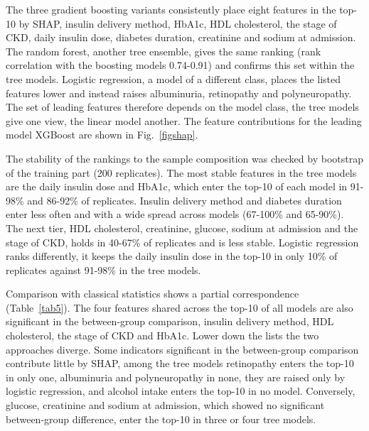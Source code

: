\documentclass[pdflatex,sn-basic,Numbered]{sn-jnl}
\begin{document}
The three gradient boosting variants consistently place eight features in the top-10 by SHAP, insulin delivery method, HbA1c, HDL cholesterol, the stage of CKD, daily insulin dose, diabetes duration, creatinine and sodium at admission. The random forest, another tree ensemble, gives the same ranking (rank correlation with the boosting models 0.74-0.91) and confirms this set within the tree models. Logistic regression, a model of a different class, places the listed features lower and instead raises albuminuria, retinopathy and polyneuropathy. The set of leading features therefore depends on the model class, the tree models give one view, the linear model another. The feature contributions for the leading model XGBoost are shown in Fig.~\ref{figshap}.

The stability of the rankings to the sample composition was checked by bootstrap of the training part (200 replicates). The most stable features in the tree models are the daily insulin dose and HbA1c, which enter the top-10 of each model in 91-98\% and 86-92\% of replicates. Insulin delivery method and diabetes duration enter less often and with a wide spread across models (67-100\% and 65-90\%). The next tier, HDL cholesterol, creatinine, glucose, sodium at admission and the stage of CKD, holds in 40-67\% of replicates and is less stable. Logistic regression ranks differently, it keeps the daily insulin dose in the top-10 in only 10\% of replicates against 91-98\% in the tree models.

Comparison with classical statistics shows a partial correspondence (Table~\ref{tab5}). The four features shared across the top-10 of all models are also significant in the between-group comparison, insulin delivery method, HDL cholesterol, the stage of CKD and HbA1c. Lower down the lists the two approaches diverge. Some indicators significant in the between-group comparison contribute little by SHAP, among the tree models retinopathy enters the top-10 in only one, albuminuria and polyneuropathy in none, they are raised only by logistic regression, and alcohol intake enters the top-10 in no model. Conversely, glucose, creatinine and sodium at admission, which showed no significant between-group difference, enter the top-10 in three or four tree models.
\end{document}

